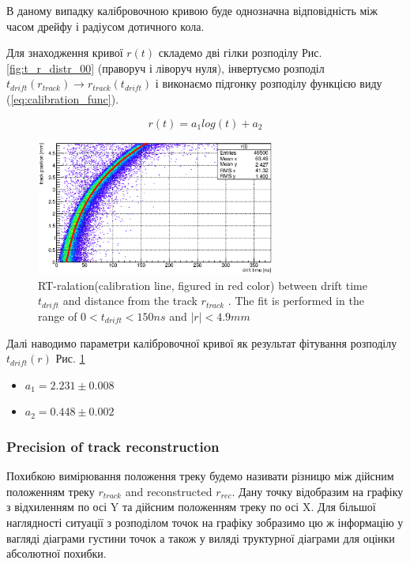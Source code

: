 \documentclass[]{article}
\begin{document}
	
	В даному випадку калібровочною кривою буде однозначна відповідність між часом дрейфу і радіусом дотичного кола.
	
	Для знаходження кривої $r(t)$ складемо дві гілки розподілу Рис. \ref{fig:t_r_distr_00} (праворуч і ліворуч нуля),	
	 інвертуємо розподіл $t_{drift}(r_{track}) \longrightarrow r_{track}(t_{drift})$ і виконаємо підгонку розподілу функцією виду (\ref{eq:calibration_func}).
	
	\begin{equation}
		\label{eq:calibration_func}
		r(t) = a_1 log(t) + a_2
	\end{equation}
	
	\begin{figure}[h]
	\includegraphics[width=0.7\textwidth]{rt_calibration.eps}
	\centering
	\caption{ RT-ralation(calibration line, figured in red color) between drift time $t_{drift}$ and distance from the  track $r_{track}$ .  The fit is performed in the range of
$0 < t_{drift} < 150 ns$ and $|r| < 4.9mm$ }
	\label{fig:calibration_00}
	\end{figure}
	
	Далі наводимо параметри калібровочної кривої як результат фітування розподілу $t_{drift}(r)$ Рис. \ref{fig:calibration_00} 
	
	\begin{itemize}
		\item $a_1 = 2.231 \pm 0.008$
		\item $a_2 = 0.448 \pm 0.002$
	\end{itemize}
	
	\subsubsection{Precision of track reconstruction}
	Похибкою вимірювання положення треку будемо називати різницю між дійсним положенням треку $r_{track}$ and reconstructed $r_{rec}$. Дану точку відобразим на графіку з відхиленням по осі Y та дійсним положенням треку по осі X. Для більшої наглядності ситуації з розподілом точок на графіку зобразимо цю ж інформацію у вагляді діаграми густини точок а також у виляді труктурної діаграми для  оцінки абсолютної похибки.
	
\end{document}
